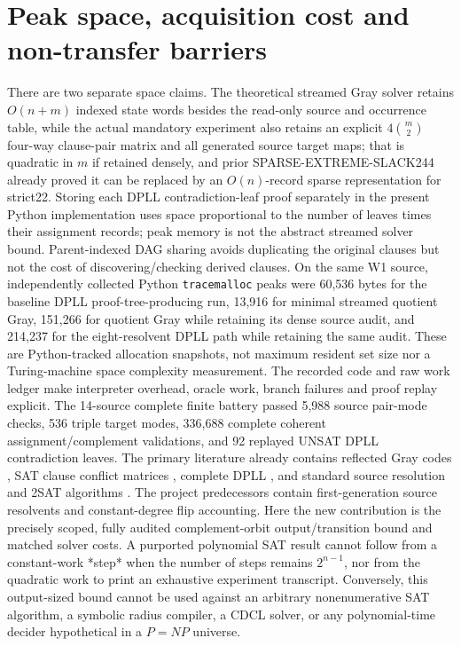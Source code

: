 \documentclass[10pt]{article}
\begin{document}
\section{Peak space, acquisition cost and non-transfer barriers}
There are two separate space claims. The theoretical streamed Gray solver retains $O(n+m)$ indexed state words besides the read-only source and occurrence table, while the actual mandatory experiment also retains an explicit $4\binom m2$ four-way clause-pair matrix and all generated source target maps; that is quadratic in $m$ if retained densely, and prior SPARSE-EXTREME-SLACK244 already proved it can be replaced by an $O(n)$-record sparse representation for strict22. Storing each DPLL contradiction-leaf proof separately in the present Python implementation uses space proportional to the number of leaves times their assignment records; peak memory is not the abstract streamed solver bound. Parent-indexed DAG sharing avoids duplicating the original clauses but not the cost of discovering/checking derived clauses.
On the same W1 source, independently collected Python \texttt{tracemalloc} peaks were 60,536 bytes for the baseline DPLL proof-tree-producing run, 13,916 for minimal streamed quotient Gray, 151,266 for quotient Gray while retaining its dense source audit, and 214,237 for the eight-resolvent DPLL path while retaining the same audit. These are Python-tracked allocation snapshots, not maximum resident set size nor a Turing-machine space complexity measurement. The recorded code and raw work ledger make interpreter overhead, oracle work, branch failures and proof replay explicit. The 14-source complete finite battery passed 5,988 source pair-mode checks, 536 triple target modes, 336,688 complete coherent assignment/complement validations, and 92 replayed UNSAT DPLL contradiction leaves.
The primary literature already contains reflected Gray codes \cite{Gilbert1958}, SAT clause conflict matrices \cite{Kullmann2003}, complete DPLL \cite{Davis1962}, and standard source resolution and 2SAT algorithms \cite{Aspvall1979}. The project predecessors contain first-generation source resolvents and constant-degree flip accounting. Here the new contribution is the precisely scoped, fully audited complement-orbit output/transition bound and matched solver costs. A purported polynomial SAT result cannot follow from a constant-work *step* when the number of steps remains $2^{n-1}$, nor from the quadratic work to print an exhaustive experiment transcript. Conversely, this output-sized bound cannot be used against an arbitrary nonenumerative SAT algorithm, a symbolic radius compiler, a CDCL solver, or any polynomial-time decider hypothetical in a $P=NP$ universe.
\end{document}
